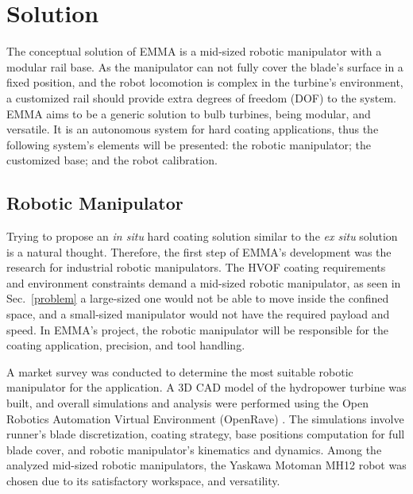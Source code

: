 \section{Solution}\label{solution}


The conceptual solution of EMMA is a mid-sized robotic manipulator with a
modular rail base. As the manipulator can not fully cover the blade's surface in
a fixed position, and the robot locomotion is complex in the turbine's
environment, a customized rail should provide extra degrees of freedom (DOF) to
the system. EMMA aims to be a generic solution to bulb turbines, being modular,
and versatile. It is an autonomous system for hard coating applications, thus
the following system's elements will be presented: the robotic manipulator; the
customized base; and the robot calibration.


\subsection{Robotic Manipulator}\label{manipulator}
Trying to propose an \textit{in situ} hard coating solution similar to
the \textit{ex situ} solution is a natural thought. Therefore, the first step of
EMMA's development was the research for industrial robotic manipulators. The
HVOF coating requirements and environment constraints demand a mid-sized
robotic manipulator, as seen in Sec.~\ref{problem} a large-sized one would not
be able to move inside the confined space, and a small-sized manipulator would not
have the required payload and speed. In EMMA's project, the
robotic manipulator will be responsible for the coating application, precision, and tool handling.

A market survey was conducted to determine the most suitable robotic
manipulator for the application. A 3D CAD model of the hydropower turbine was
built, and overall simu\-lations and analysis were performed using the Open
Robotics Automation Virtual Environment (OpenRave) \cite{diankov2008openrave}.
The simulations involve runner's blade discretization, coating strategy, base
positions computation for full blade cover, and robotic manipulator's kinematics
and dynamics. Among the analyzed mid-sized robotic manipulators, the Yaskawa Motoman MH12
robot was chosen due to its satisfactory workspace, and versatility.

